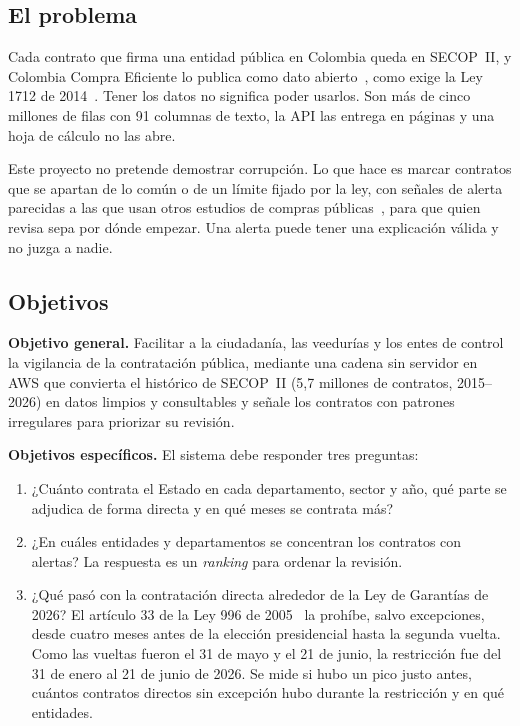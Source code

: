 \documentclass[conference,letterpaper]{IEEEtran}
\begin{document}
\subsection{El problema}
Cada contrato que firma una entidad pública en Colombia queda en SECOP~II, y Colombia Compra Eficiente
lo publica como dato abierto~\cite{ancp_secop}, como exige la Ley 1712 de 2014~\cite{ley1712}. Tener
los datos no significa poder usarlos. Son más de cinco millones de filas con 91 columnas de texto, la API
las entrega en páginas y una hoja de cálculo no las abre.

Este proyecto no pretende demostrar corrupción. Lo que hace es marcar contratos que se apartan de lo
común o de un límite fijado por la ley, con señales de alerta parecidas a las que usan otros estudios
de compras públicas~\cite{ocp2016,fazekas2020}, para que quien revisa sepa por dónde empezar. Una
alerta puede tener una explicación válida y no juzga a nadie.

\subsection{Objetivos}
\textbf{Objetivo general.} Facilitar a la ciudadanía, las veedurías y los entes de control la vigilancia de la contratación pública, mediante una cadena sin servidor en AWS que convierta el histórico de SECOP~II (5,7 millones de contratos, 2015--2026) en datos limpios y consultables y señale los contratos con patrones irregulares para priorizar su revisión.

\textbf{Objetivos específicos.} El sistema debe responder tres preguntas:
\begin{enumerate}[leftmargin=*]
  \item ¿Cuánto contrata el Estado en cada departamento, sector y año, qué parte se adjudica de forma
        directa y en qué meses se contrata más?
  \item ¿En cuáles entidades y departamentos se concentran los contratos con alertas? La respuesta es un
        \emph{ranking} para ordenar la revisión.
  \item ¿Qué pasó con la contratación directa alrededor de la Ley de Garantías de 2026? El artículo 33 de
        la Ley 996 de 2005~\cite{ley996} la prohíbe, salvo excepciones, desde cuatro meses antes de la
        elección presidencial hasta la segunda vuelta. Como las vueltas fueron el 31 de mayo y el 21 de
        junio, la restricción fue del 31 de enero al 21 de junio de 2026. Se mide si hubo un pico justo
        antes, cuántos contratos directos sin excepción hubo durante la restricción y en qué entidades.
\end{enumerate}
\end{document}
